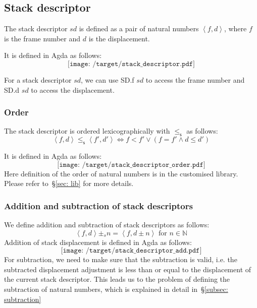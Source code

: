 \documentclass[12pt,a4paper]{report}
\theoremstyle{definition}
\newcommand{\secref}[1]{\S\ref{#1}}
\newcommand{\dpink}[1]{\textcolor{darkpink}{#1}}
\newcommand{\ang}[1]{\left\langle #1 \right\rangle}
\begin{document}
    \subsection{Stack descriptor}
    The stack descriptor $sd$ is defined as a pair of natural numbers $\ang{f, d}$, where $f$ is the frame number and $d$ is the displacement. 

    It is defined in Agda as follows:
    \[\texttt{[image: /target/stack\_descriptor.pdf]}\]

    For a stack descriptor $sd$, we can use \dpink{SD.f} $sd$ to access the frame number and \dpink{SD.d} $sd$ to access the displacement. 

    \subsubsection{Order}
    The stack descriptor is ordered lexicographically with $\leq_\mathsf{s}$ as follows:
    \[\ang{f, d} \leq_\mathsf{s} \ang{f', d'} \Leftrightarrow f < f' \lor (f = f' \land d \leq d')\]

    It is defined in Agda as follows:
    \[\texttt{[image: /target/stack\_descriptor\_order.pdf]}\]
    Here definition of the order of natural numbers is in the customised library. Please refer to~\secref{sec: lib} for more details.

    \subsubsection{Addition and subtraction of stack descriptors}
    We define addition and subtraction of stack descriptors as follows:
    \[\ang{f, d} \pm_s n = \ang{f, d \pm n} \text{ for } n \in \mathbb{N}\]
    Addition of stack displacement is defined in Agda as follows:
    \[\texttt{[image: /target/stack\_descriptor\_add.pdf]}\]
    For subtraction, we need to make sure that the subtraction is valid, i.e. the subtracted displacement adjustment is less than or equal to the displacement of the current stack descriptor. This leads us to the problem of defining the subtraction of natural numbers, which is explained in detail in~\secref{subsec: subtraction}
\end{document}
